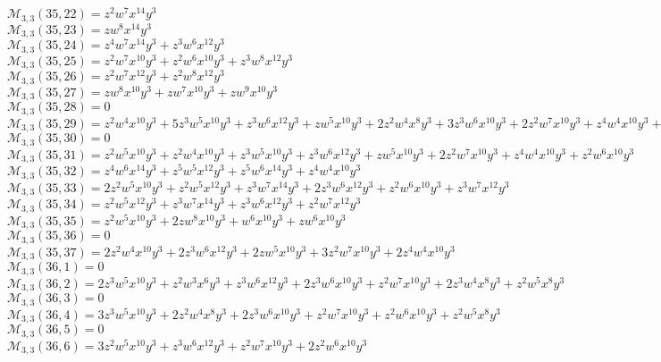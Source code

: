 \documentclass[12pt]{memoireuqam1.3}
\begin{document}
$\mathcal{M}_{3,3}(35,22)=z^2w^7x^{14}y^3$\\
$\mathcal{M}_{3,3}(35,23)=zw^8x^{14}y^3$\\
$\mathcal{M}_{3,3}(35,24)=z^4w^7x^{14}y^3+z^3w^6x^{12}y^3$\\
$\mathcal{M}_{3,3}(35,25)=z^2w^7x^{10}y^3+z^2w^6x^{10}y^3+z^3w^8x^{12}y^3$\\
$\mathcal{M}_{3,3}(35,26)=z^2w^7x^{12}y^3+z^2w^8x^{12}y^3$\\
$\mathcal{M}_{3,3}(35,27)=zw^8x^{10}y^3+zw^7x^{10}y^3+zw^9x^{10}y^3$\\
$\mathcal{M}_{3,3}(35,28)=0$\\
$\mathcal{M}_{3,3}(35,29)=z^2w^4x^{10}y^3+5z^3w^5x^{10}y^3+z^3w^6x^{12}y^3+zw^5x^{10}y^3+2z^2w^4x^8y^3+3z^3w^6x^{10}y^3+2z^2w^7x^{10}y^3+z^4w^4x^{10}y^3+z^2w^5x^8y^3$\\
$\mathcal{M}_{3,3}(35,30)=0$\\
$\mathcal{M}_{3,3}(35,31)=z^2w^5x^{10}y^3+z^2w^4x^{10}y^3+z^3w^5x^{10}y^3+z^3w^6x^{12}y^3+zw^5x^{10}y^3+2z^2w^7x^{10}y^3+z^4w^4x^{10}y^3+z^2w^6x^{10}y^3$\\
$\mathcal{M}_{3,3}(35,32)=z^4w^6x^{14}y^3+z^5w^5x^{12}y^3+z^5w^6x^{14}y^3+z^4w^4x^{10}y^3$\\
$\mathcal{M}_{3,3}(35,33)=2z^2w^5x^{10}y^3+z^2w^5x^{12}y^3+z^3w^7x^{14}y^3+2z^3w^6x^{12}y^3+z^2w^6x^{10}y^3+z^3w^7x^{12}y^3$\\
$\mathcal{M}_{3,3}(35,34)=z^2w^5x^{12}y^3+z^3w^7x^{14}y^3+z^3w^6x^{12}y^3+z^2w^7x^{12}y^3$\\
$\mathcal{M}_{3,3}(35,35)=z^2w^5x^{10}y^3+2zw^8x^{10}y^3+w^6x^{10}y^3+zw^6x^{10}y^3$\\
$\mathcal{M}_{3,3}(35,36)=0$\\
$\mathcal{M}_{3,3}(35,37)=2z^2w^4x^{10}y^3+2z^3w^6x^{12}y^3+2zw^5x^{10}y^3+3z^2w^7x^{10}y^3+2z^4w^4x^{10}y^3$\\
$\mathcal{M}_{3,3}(36,1)=0$\\
$\mathcal{M}_{3,3}(36,2)=2z^3w^5x^{10}y^3+z^2w^3x^6y^3+z^3w^6x^{12}y^3+2z^3w^6x^{10}y^3+z^2w^7x^{10}y^3+2z^3w^4x^8y^3+z^2w^5x^8y^3$\\
$\mathcal{M}_{3,3}(36,3)=0$\\
$\mathcal{M}_{3,3}(36,4)=3z^3w^5x^{10}y^3+2z^2w^4x^8y^3+2z^3w^6x^{10}y^3+z^2w^7x^{10}y^3+z^2w^6x^{10}y^3+z^2w^5x^8y^3$\\
$\mathcal{M}_{3,3}(36,5)=0$\\
$\mathcal{M}_{3,3}(36,6)=3z^2w^5x^{10}y^3+z^3w^6x^{12}y^3+z^2w^7x^{10}y^3+2z^2w^6x^{10}y^3$\\
\end{document}
